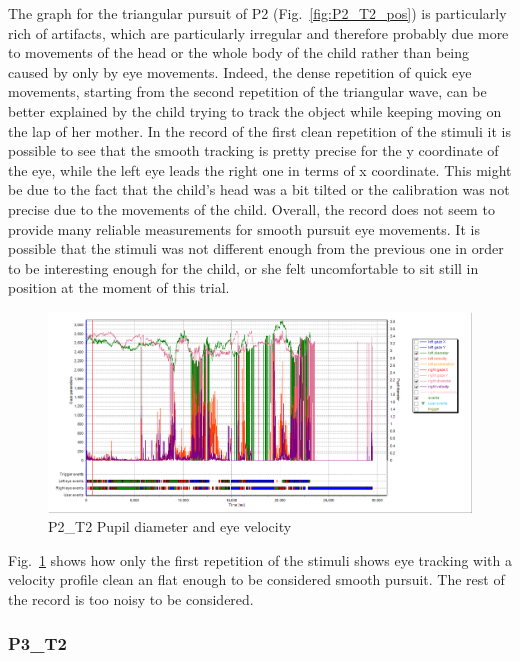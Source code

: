 The graph for the triangular pursuit of P2 (Fig.~\ref{fig:P2_T2_pos})  is particularly rich of artifacts, which are particularly irregular and therefore probably due more to movements of the head or the whole body of the child rather than being caused by only by eye movements. Indeed, the dense repetition of quick eye movements, starting from the second repetition of the triangular wave, can be better explained by the child trying to track the object while keeping moving on the lap of her mother. In the record of the first clean repetition of the stimuli it is possible to see that the smooth tracking is pretty precise for the y coordinate of the eye, while the left eye leads the right one in terms of x coordinate. This might be due to the fact that the child’s head was a bit tilted or the calibration was not precise due to the movements of the child. Overall, the record does not seem to provide many reliable measurements for smooth pursuit eye movements. It is possible that the stimuli was not different enough from the previous one in order to be interesting enough for the child, or she felt uncomfortable to sit still in position at the moment of this trial.

\begin{figure}[h]
  \centering
  \includegraphics[width=.8\textwidth]{figures/graphs/P2_T2(triangular)_VP.png}
  \caption[P2\_T2 pupil velocity]{P2\_T2 Pupil diameter and eye velocity}
  \label{fig:P2_T2_vel}
\end{figure}

Fig.~\ref{fig:P2_T2_vel} shows how only the first repetition of the stimuli shows eye tracking with a velocity profile clean an flat enough to be considered smooth pursuit. The rest of the record is too noisy to be considered.




\subsubsection{P3\_T2}
\label{sec:P3_T2}

